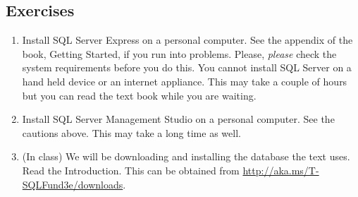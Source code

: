 \documentclass{article}
\begin{document}
    \subsection{Exercises}

    \begin{enumerate}

        \item Install SQL Server Express on a personal computer. See the appendix of the book, Getting Started, if you run into problems. Please, \textit{please} check the system requirements before you do this. You cannot install SQL Server on a hand held device or an internet appliance. This may take a couple of hours but you can read the text book while you are waiting.


        \item Install SQL Server Management Studio on a personal computer. See the cautions above. This may take a long time as well.


        \item (In class) We will be downloading and installing the database the text uses. Read the Introduction. This can be obtained from \url{http://aka.ms/T-SQLFund3e/downloads}.



    \end{enumerate}
\end{document}
